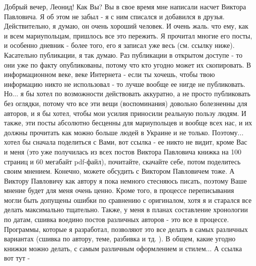 Добрый вечер, Леонид! Как Вы? Вы в свое время мне написали насчет Виктора
Павловича. Я об этом не забыл - я с ним списался и добавился в друзья.
Действительно, я думаю, он очень хороший человек. И очень жаль. что ему, как и
всем мариупольцам, пришлось все это пережить. Я прочитал многие его посты, и
особенно дневник - более того, его я записал уже весь (см. ссылку ниже).
Касательно публикации, я так думаю. Раз публикации в открытом доступе - то они
уже по факту опубликованы, потому что кто угодно может их скопировать. В
информационном веке, веке Интернета - если ты хочешь, чтобы твою информацию
никто не использовал - то лучше вообще ее нигде не публиковать. Но... я бы
хотел по возможности действовать аккуратно, а не просто публиковать без
оглядки, потому что все эти вещи (воспоминания) довольно болезненны для
авторов, и я бы хотел, чтобы мои усилия приносили реальную пользу людям. И
также, эти посты абсолютно бесценны для мариупольцев и вообще всех нас, и их
должны прочитать как можно больше людей в Украине и не только.  Поэтому...
хотел бы сначала поделиться с Вами, вот ссылка - ее никто не видит, кроме Вас и
меня (это уже получилась из всех постов Виктора Павловича книжка на 100 страниц
и 60 мегабайт pdf-файл), почитайте, скачайте себе, потом поделитесь своим
мнением. Конечно, можете обсудить с Виктором Павловичем тоже. А Виктору
Павловичу как автору я пока немного стесняюсь писать, поэтому Ваше мнение будет
для меня очень ценно. Кроме того, в процессе переписывания могли быть допущены
ошибки по сравнению с оригиналом, хотя я и старался все делать максимально
тщательно. Также, у меня в планах составление хронологии по датам, сшивка
воедино постов различных авторов - это все в процессе. Программы, которые я
разработал, позволяют это все делать в самых различных вариантах (сшивка по
автору, теме, разбивка и тд. ). В общем, какие угодно книжки можно делать, с
самым различным оформлением и стилем... А ссылка вот тут -

